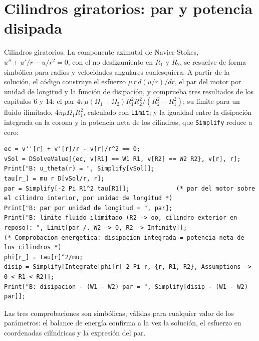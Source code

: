 \documentclass[10pt,openany]{book}
\begin{document}
\section{Cilindros giratorios: par y potencia disipada}

Cilindros giratorios. La componente azimutal de Navier-Stokes, \(u'' + u'/r - u/r^{2} = 0\), con el no deslizamiento en \(R_1\) y \(R_2\), se resuelve de forma simbólica para radios y velocidades angulares cualesquiera. A partir de la solución, el código construye el esfuerzo \(\mu\,r\,d(u/r)/dr\), el par del motor por unidad de longitud y la función de disipación, y comprueba tres resultados de los capítulos 6 y 14: el par \(4\pi\mu(\Omega_1 - \Omega_2)R_1^{2}R_2^{2}/(R_2^{2} - R_1^{2})\); su límite para un fluido ilimitado, \(4\pi\mu\Omega_1 R_1^{2}\), calculado con \texttt{Limit}; y la igualdad entre la disipación integrada en la corona y la potencia neta de los cilindros, que \texttt{Simplify} reduce a cero:
\begin{lstlisting}[style=studium]
ec = v''[r] + v'[r]/r - v[r]/r^2 == 0;
vSol = DSolveValue[{ec, v[R1] == W1 R1, v[R2] == W2 R2}, v[r], r];
Print["B: u_theta(r) = ", Simplify[vSol]];
tau[r_] = mu r D[vSol/r, r];
par = Simplify[-2 Pi R1^2 tau[R1]];             (* par del motor sobre el cilindro interior, por unidad de longitud *)
Print["B: par por unidad de longitud = ", par];
Print["B: limite fluido ilimitado (R2 -> oo, cilindro exterior en reposo): ", Limit[par /. W2 -> 0, R2 -> Infinity]];
(* Comprobacion energetica: disipacion integrada = potencia neta de los cilindros *)
phi[r_] = tau[r]^2/mu;
disip = Simplify[Integrate[phi[r] 2 Pi r, {r, R1, R2}, Assumptions -> 0 < R1 < R2]];
Print["B: disipacion - (W1 - W2) par = ", Simplify[disip - (W1 - W2) par]];
\end{lstlisting}
Las tres comprobaciones son simbólicas, válidas para cualquier valor de los parámetros: el balance de energía confirma a la vez la solución, el esfuerzo en coordenadas cilíndricas y la expresión del par.
\end{document}
